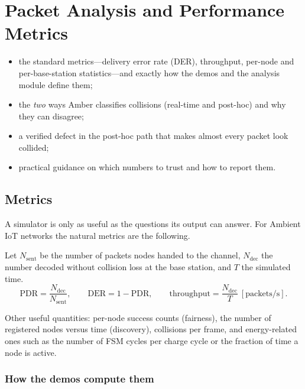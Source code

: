 \chapter{Packet Analysis and Performance Metrics}
\label{ch:analysis}

\begin{defbox}
\begin{itemize}
 \item the standard metrics---delivery error rate (DER), throughput, per-node and per-base-station statistics---and exactly how the demos and the analysis module define them;
 \item the \emph{two} ways Amber classifies collisions (real-time and post-hoc) and why they can disagree;
 \item a verified defect in the post-hoc path that makes almost every packet look collided;
 \item practical guidance on which numbers to trust and how to report them.
\end{itemize}
\end{defbox}

\section{Metrics}
\label{sec:metrics}

A simulator is only as useful as the questions its output can answer. For Ambient IoT networks the natural metrics are the following.

\begin{defbox}
Let $N_{\mathrm{sent}}$ be the number of packets nodes handed to the channel, $N_{\mathrm{dec}}$ the number decoded without collision loss at the base station, and $T$ the simulated time.
\[
 \mathrm{PDR}=\frac{N_{\mathrm{dec}}}{N_{\mathrm{sent}}},\qquad
 \mathrm{DER}=1-\mathrm{PDR},\qquad
 \text{throughput}=\frac{N_{\mathrm{dec}}}{T}\ [\text{packets/s}].
\]
\end{defbox}
Other useful quantities: per-node success counts (fairness), the number of registered nodes versus time (discovery), collisions per frame, and energy-related ones such as the number of FSM cycles per charge cycle or the fraction of time a node is active.

\subsection{How the demos compute them}

